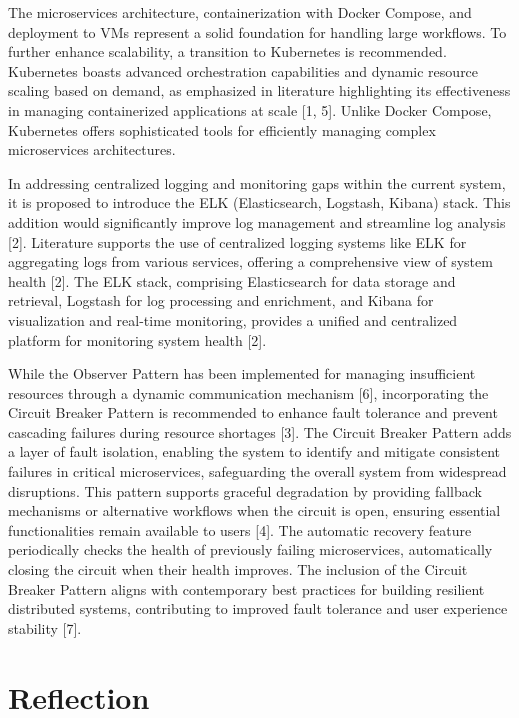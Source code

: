 \documentclass[conference, onecolumn]{IEEEtran}
\begin{document}
The microservices architecture, containerization with Docker Compose, and deployment to VMs represent a solid foundation for handling large workflows. To further enhance scalability, a transition to Kubernetes is recommended. Kubernetes boasts advanced orchestration capabilities and dynamic resource scaling based on demand, as emphasized in literature highlighting its effectiveness in managing containerized applications at scale [1, 5]. Unlike Docker Compose, Kubernetes offers sophisticated tools for efficiently managing complex microservices architectures.

In addressing centralized logging and monitoring gaps within the current system, it is proposed to introduce the ELK (Elasticsearch, Logstash, Kibana) stack. This addition would significantly improve log management and streamline log analysis [2]. Literature supports the use of centralized logging systems like ELK for aggregating logs from various services, offering a comprehensive view of system health [2]. The ELK stack, comprising Elasticsearch for data storage and retrieval, Logstash for log processing and enrichment, and Kibana for visualization and real-time monitoring, provides a unified and centralized platform for monitoring system health [2].

While the Observer Pattern has been implemented for managing insufficient resources through a dynamic communication mechanism [6], incorporating the Circuit Breaker Pattern is recommended to enhance fault tolerance and prevent cascading failures during resource shortages [3]. The Circuit Breaker Pattern adds a layer of fault isolation, enabling the system to identify and mitigate consistent failures in critical microservices, safeguarding the overall system from widespread disruptions. This pattern supports graceful degradation by providing fallback mechanisms or alternative workflows when the circuit is open, ensuring essential functionalities remain available to users [4]. The automatic recovery feature periodically checks the health of previously failing microservices, automatically closing the circuit when their health improves. The inclusion of the Circuit Breaker Pattern aligns with contemporary best practices for building resilient distributed systems, contributing to improved fault tolerance and user experience stability [7].

\section{Reflection}
\end{document}
